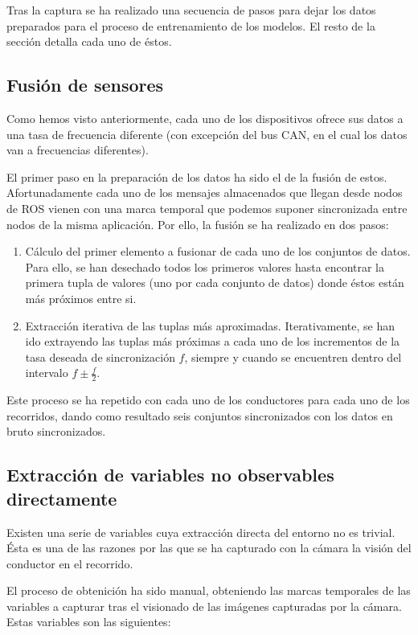 Tras la captura se ha realizado una secuencia de pasos para dejar los datos preparados para el proceso de entrenamiento de los modelos. El resto de la sección detalla cada uno de éstos.

\subsection{Fusión de sensores}

Como hemos visto anteriormente, cada uno de los dispositivos ofrece sus datos a una tasa de frecuencia diferente (con excepción del bus CAN, en el cual los datos van a frecuencias diferentes).

El primer paso en la preparación de los datos ha sido el de la fusión de estos. Afortunadamente cada uno de los mensajes almacenados que llegan desde nodos de ROS vienen con una marca temporal que podemos suponer sincronizada entre nodos de la misma aplicación. Por ello, la fusión se ha realizado en dos pasos:

\begin{enumerate}
	\item Cálculo del primer elemento a fusionar de cada uno de los conjuntos de datos. Para ello, se han desechado todos los primeros valores hasta encontrar la primera tupla de valores (uno por cada conjunto de datos) donde éstos están más próximos entre si.
	\item Extracción iterativa de las tuplas más aproximadas. Iterativamente, se han ido extrayendo las tuplas más próximas a cada uno de los incrementos de la tasa deseada de sincronización $f$, siempre y cuando se encuentren dentro del intervalo $f \pm \frac{f}{2}$.
\end{enumerate}

Este proceso se ha repetido con cada uno de los conductores para cada uno de los recorridos, dando como resultado seis conjuntos sincronizados con los datos en bruto sincronizados.

\subsection{Extracción de variables no observables directamente}

Existen una serie de variables cuya extracción directa del entorno no es trivial. Ésta es una de las razones por las que se ha capturado con la cámara la visión del conductor en el recorrido.

El proceso de obtenición ha sido manual, obteniendo las marcas temporales de las variables a capturar tras el visionado de las imágenes capturadas por la cámara. Estas variables son las siguientes:

